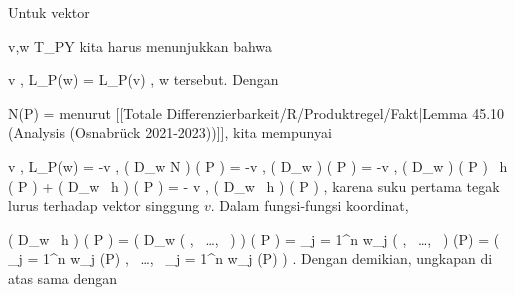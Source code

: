 {

Untuk vektor

\mavergleichskette
{\vergleichskette
{ v,w
}
{ \in }{ T_PY
}
{  }{
}
{    }{
}
{   }{
}
}
{}{}{}
kita harus menunjukkan bahwa

\mavergleichskettedisp
{\vergleichskette
{ \left\langle  v  ,  L_P(w)  \right\rangle
}
{ =} { \left\langle L_P(v) ,  w  \right\rangle
}
{ } {
}
{ } {
}
{ } {
}
}
{}{}{}
tersebut. Dengan

\mavergleichskette
{\vergleichskette
{ N(P)
}
{ = }{ {  }
}
{  }{
}
{    }{
}
{   }{
}
}
{}{}{}
menurut
[[Totale Differenzierbarkeit/R/Produktregel/Fakt|Lemma 45.10 (Analysis (Osnabrück 2021-2023))]], kita mempunyai

\mavergleichskettealignhandlinks
{\vergleichskettealignhandlinks
{ \left\langle  v  ,  L_P(w)  \right\rangle
}
{ =} { -\left\langle  v  ,  \left(  D_{w}  N   \right) \left(   P   \right)   \right\rangle
}
{ =} { -\left\langle  v  ,  \left(  D_{w}  {  }   \right) \left(   P   \right)     \right\rangle
}
{ =} { -\left\langle  v  ,  \left(  D_{w}  {  }   \right) \left(   P   \right) \cdot
{} \,  h  (  P ) + {  } \cdot  \left(  D_{w}
 \,  h   \right) \left(   P   \right)   \right\rangle
}
{ =} { - {  } \left\langle  v  ,  \left(  D_{w}
 \,  h   \right) \left(   P   \right)    \right\rangle
}
}
{}
{}{,}
karena suku pertama tegak lurus terhadap vektor singgung $v$. Dalam fungsi-fungsi koordinat,

\mavergleichskettealignhandlinks
{\vergleichskettealignhandlinks
{ \left(  D_{w}
 \,  h   \right) \left(   P   \right)
}
{ =} { \left(  D_{w}  \left(  {  }   , \,   \ldots  , \,   {  }                 \right)    \right) \left(   P   \right)
}
{ =} { \sum_{j = 1}^n  w_j  {  }  \left(  {  }   , \,   \ldots  , \,   {  }                 \right) (P)
}
{ =} { \left(  \sum_{j = 1}^n  w_j  {  }  {  } (P)   , \,   \ldots  , \,   \sum_{j = 1}^n  w_j  {  }  {  } (P)                 \right)
}
{ } {
}
}
{}
{}{.}
Dengan demikian, ungkapan di atas sama dengan

}
